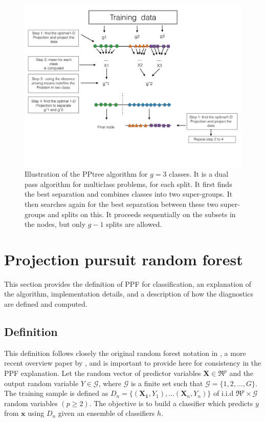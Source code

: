 \documentclass[12pt]{article}\usepackage[]{graphicx}\usepackage[]{color}
\begin{document}
\begin{figure}[!hbt]
\centering
\includegraphics[width=1\linewidth]{diag2.pdf}

\caption{Illustration of the PPtree algorithm for $g=3$ classes. It is a dual pass algorithm for multiclass problems, for each split. It first finds the best separation and combines classes into two super-groups. It then searches again for the best separation between these two super-groups and splits on this. It proceeds sequentially on the subsets in the nodes, but only $g-1$ splits are allowed. \label{diagpp1}}
\end{figure}

\newpage

\section{Projection pursuit random forest}\label{PPFsec}


This section provides the definition of PPF for classification, an explanation of the algorithm, implementation details, and a description of how the diagnostics are defined and computed. 

\subsection{Definition}

This definition follows closely the original random forest notation in \cite{breiman2001random}, a more recent overview paper by \cite{Biau:2008}, and is important to provide here for consistency in the PPF explanation. Let the random vector of predictor variables $\mathbf{X}\in \Re^p$  and  the output random variable $Y \in \mathscr{G}$, where $\mathscr{G}$ is a finite set such that $\mathscr{G}=\{1,2, \ldots, G\}$. The training sample is defined as $D_n=\{(\mathbf{X_1}, Y_1), \ldots (\mathbf{X}_n, Y_n)\}$ of i.i.d $\Re^p \times \mathscr{G}$ random variables $(p\geq 2)$.
The objective is to build a classifier which predicts $y$ from $\mathbf{x}$ using $D_n$ given an ensemble of classifiers $h$.
\end{document}
